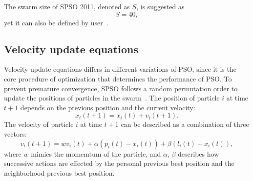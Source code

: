 The swarm size of SPSO 2011, denoted as $S$, is suggested as
\begin{displaymath}
S = 40,
\end{displaymath}
yet it can also be defined by user~\cite{Clerc:2012:SPSO2011}.


\subsection{Velocity update equations}

Velocity update equations differs in different variations of PSO, 
since it is the core procedure of optimization that determines the performance of PSO.
To prevent premature convergence, 
SPSO follows a random permutation order to update the positions of particles in the swarm~\cite{Clerc:2012:SPSO2011}.
The position of particle $i$ at time $t+1$ depends on the previous position and the current velocity:
\begin{displaymath}
x_i(t+1) = x_i(t) + v_i(t+1).
\end{displaymath}
The velocity of particle $i$ at time $t+1$ can be described as a combination of three vectors:
\begin{displaymath}
v_i(t+1) = w v_i(t) + \alpha (p_i(t) - x_i(t)) + \beta (l_i(t) - x_i(t)),
\end{displaymath}
where $w$ mimics the momemtum of the particle, and $\alpha$, $\beta$ describes how successive actions are effected by the personal previous best position and the neighborhood previous best position.


